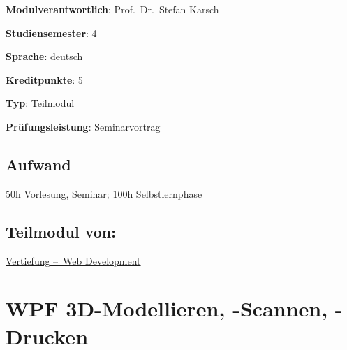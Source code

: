 \begin{modulHead}
\textbf{Modulverantwortlich}: Prof.~Dr.~Stefan
Karsch
\end{modulHead}
\begin{modulHead}
\textbf{Studiensemester}:
4
\end{modulHead}
\begin{modulHead}
\textbf{Sprache}:
deutsch
\end{modulHead}
\begin{modulHead}
\textbf{Kreditpunkte}:
5
\end{modulHead}
\begin{modulHead}
\textbf{Typ}:
Teilmodul
\end{modulHead}
\begin{modulHead}
\textbf{Prüfungsleistung}:
Seminarvortrag
\end{modulHead}


\hypertarget{aufwandpathlabelmi-2017modulbeschreibungen-bachelorba_wd_praktische-it-sicherheit}{%
\section*{Aufwand\label{/mi-2017/modulbeschreibungen-bachelor/BA_WD_Praktische-IT-Sicherheit}}\label{aufwandpathlabelmi-2017modulbeschreibungen-bachelorba_wd_praktische-it-sicherheit}}

50h Vorlesung, Seminar; 100h Selbstlernphase

\hypertarget{teilmodul-vonpathlabelmi-2017modulbeschreibungen-bachelorba_wd_praktische-it-sicherheit}{%
\section*{Teilmodul
von:\label{/mi-2017/modulbeschreibungen-bachelor/BA_WD_Praktische-IT-Sicherheit}}\label{teilmodul-vonpathlabelmi-2017modulbeschreibungen-bachelorba_wd_praktische-it-sicherheit}}

\hyperref[/mi-2017/modulbeschreibungen-bachelor/BA_Vertiefung-Web_Development]{Vertiefung – Web Development}

\hypertarget{wpf-3d-modellieren--scannen--druckenpathlabelmi-2017modulbeschreibungen-bachelorba_wpf-3d-msd}{%
\chapter{WPF 3D-Modellieren, -Scannen,
-Drucken\label{/mi-2017/modulbeschreibungen-bachelor/BA_WPF-3D-MSD}}\label{wpf-3d-modellieren--scannen--druckenpathlabelmi-2017modulbeschreibungen-bachelorba_wpf-3d-msd}}

